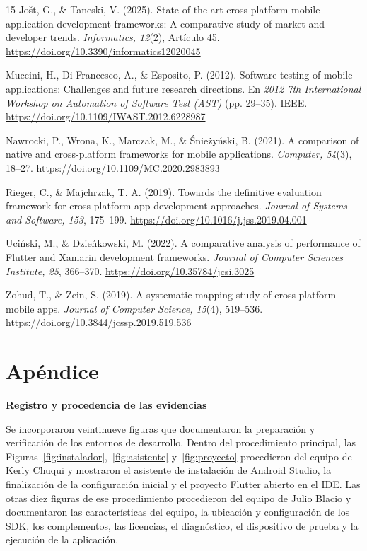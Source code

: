 \documentclass[12pt,letterpaper]{article}
\begin{document}
\begin{thebibliography}{15}
Jo\v{s}t, G., \& Taneski, V. (2025). State-of-the-art cross-platform mobile application development frameworks: A comparative study of market and developer trends. \textit{Informatics, 12}(2), Artículo 45. \url{https://doi.org/10.3390/informatics12020045}

Muccini, H., Di Francesco, A., \& Esposito, P. (2012). Software testing of mobile applications: Challenges and future research directions. En \textit{2012 7th International Workshop on Automation of Software Test (AST)} (pp. 29--35). IEEE. \url{https://doi.org/10.1109/IWAST.2012.6228987}

Nawrocki, P., Wrona, K., Marczak, M., \& \'{S}nie\.{z}y\'{n}ski, B. (2021). A comparison of native and cross-platform frameworks for mobile applications. \textit{Computer, 54}(3), 18--27. \url{https://doi.org/10.1109/MC.2020.2983893}

Rieger, C., \& Majchrzak, T. A. (2019). Towards the definitive evaluation framework for cross-platform app development approaches. \textit{Journal of Systems and Software, 153}, 175--199. \url{https://doi.org/10.1016/j.jss.2019.04.001}

Uci\'{n}ski, M., \& Dzie\'{n}kowski, M. (2022). A comparative analysis of performance of Flutter and Xamarin development frameworks. \textit{Journal of Computer Sciences Institute, 25}, 366--370. \url{https://doi.org/10.35784/jcsi.3025}

Zohud, T., \& Zein, S. (2019). A systematic mapping study of cross-platform mobile apps. \textit{Journal of Computer Science, 15}(4), 519--536. \url{https://doi.org/10.3844/jcssp.2019.519.536}
\end{thebibliography}

\clearpage
\appendix
\section{Apéndice}
\begin{center}\textbf{Registro y procedencia de las evidencias}\end{center}
Se incorporaron veintinueve figuras que documentaron la preparación y verificación de los entornos de desarrollo. Dentro del procedimiento principal, las Figuras~\ref{fig:instalador},~\ref{fig:asistente} y~\ref{fig:proyecto} procedieron del equipo de Kerly Chuqui y mostraron el asistente de instalación de Android Studio, la finalización de la configuración inicial y el proyecto Flutter abierto en el IDE. Las otras diez figuras de ese procedimiento procedieron del equipo de Julio Blacio y documentaron las características del equipo, la ubicación y configuración de los SDK, los complementos, las licencias, el diagnóstico, el dispositivo de prueba y la ejecución de la aplicación.
\end{document}
